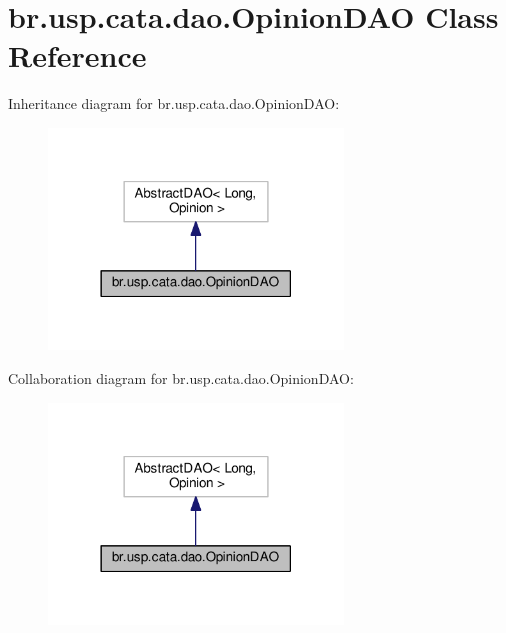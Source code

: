 \hypertarget{classbr_1_1usp_1_1cata_1_1dao_1_1_opinion_d_a_o}{\section{br.\+usp.\+cata.\+dao.\+Opinion\+D\+A\+O Class Reference}
\label{classbr_1_1usp_1_1cata_1_1dao_1_1_opinion_d_a_o}
}


Inheritance diagram for br.\+usp.\+cata.\+dao.\+Opinion\+D\+A\+O\+:\nopagebreak
\begin{figure}[H]
\begin{center}
\leavevmode
\includegraphics[width=222pt]{classbr_1_1usp_1_1cata_1_1dao_1_1_opinion_d_a_o__inherit__graph}
\end{center}
\end{figure}


Collaboration diagram for br.\+usp.\+cata.\+dao.\+Opinion\+D\+A\+O\+:\nopagebreak
\begin{figure}[H]
\begin{center}
\leavevmode
\includegraphics[width=222pt]{classbr_1_1usp_1_1cata_1_1dao_1_1_opinion_d_a_o__coll__graph}
\end{center}
\end{figure}
